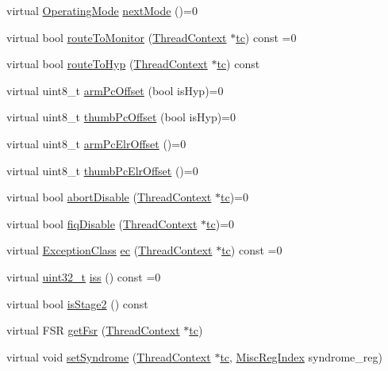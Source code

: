 \begin{DoxyCompactItemize}
\item 
virtual \hyperlink{namespaceArmISA_ae306b3353ed3d62bb2e6de130b3c9eaa}{OperatingMode} \hyperlink{classArmISA_1_1ArmFault_a245c0940c93d0130b3efaf4e1d8ad542}{nextMode} ()=0
\item 
virtual bool \hyperlink{classArmISA_1_1ArmFault_af62e0649938431df8cfab96f0e3fb0a1}{routeToMonitor} (\hyperlink{classThreadContext}{ThreadContext} $\ast$\hyperlink{namespaceArmISA_a5aff829af55e65b802d83dfcef4e9dd0}{tc}) const =0
\item 
virtual bool \hyperlink{classArmISA_1_1ArmFault_a6fa7b734487c2a8da04a28ace414a355}{routeToHyp} (\hyperlink{classThreadContext}{ThreadContext} $\ast$\hyperlink{namespaceArmISA_a5aff829af55e65b802d83dfcef4e9dd0}{tc}) const 
\item 
virtual uint8\_\-t \hyperlink{classArmISA_1_1ArmFault_a62f88e7446d881692b70a4c53a66709e}{armPcOffset} (bool isHyp)=0
\item 
virtual uint8\_\-t \hyperlink{classArmISA_1_1ArmFault_a5622623cc4ac5dfcc5b2c78c41997ce4}{thumbPcOffset} (bool isHyp)=0
\item 
virtual uint8\_\-t \hyperlink{classArmISA_1_1ArmFault_ac6225f20625dd9cd1d2ff5a5813ccb56}{armPcElrOffset} ()=0
\item 
virtual uint8\_\-t \hyperlink{classArmISA_1_1ArmFault_a846a83fa30036c124fe623647dd70c5d}{thumbPcElrOffset} ()=0
\item 
virtual bool \hyperlink{classArmISA_1_1ArmFault_a159a2321e7b2cdb89571d6bb04064c4a}{abortDisable} (\hyperlink{classThreadContext}{ThreadContext} $\ast$\hyperlink{namespaceArmISA_a5aff829af55e65b802d83dfcef4e9dd0}{tc})=0
\item 
virtual bool \hyperlink{classArmISA_1_1ArmFault_a90898a2c4e92e85e6cdecddc2d82a621}{fiqDisable} (\hyperlink{classThreadContext}{ThreadContext} $\ast$\hyperlink{namespaceArmISA_a5aff829af55e65b802d83dfcef4e9dd0}{tc})=0
\item 
virtual \hyperlink{namespaceArmISA_a04034d12009cf36227f4d2abff3331a2}{ExceptionClass} \hyperlink{classArmISA_1_1ArmFault_ab1ac230a4768ca0e080718a7382ecc18}{ec} (\hyperlink{classThreadContext}{ThreadContext} $\ast$\hyperlink{namespaceArmISA_a5aff829af55e65b802d83dfcef4e9dd0}{tc}) const =0
\item 
virtual \hyperlink{Type_8hh_a435d1572bf3f880d55459d9805097f62}{uint32\_\-t} \hyperlink{classArmISA_1_1ArmFault_a12a2298da9af24c62275dac1cf76a888}{iss} () const =0
\item 
virtual bool \hyperlink{classArmISA_1_1ArmFault_a61bc59380024a05bdcbb39fb27e0293d}{isStage2} () const 
\item 
virtual FSR \hyperlink{classArmISA_1_1ArmFault_a48f7b7354d7dcf9850a65f9f433c4871}{getFsr} (\hyperlink{classThreadContext}{ThreadContext} $\ast$\hyperlink{namespaceArmISA_a5aff829af55e65b802d83dfcef4e9dd0}{tc})
\item 
virtual void \hyperlink{classArmISA_1_1ArmFault_a618b248f8f365d00661d7663152848d6}{setSyndrome} (\hyperlink{classThreadContext}{ThreadContext} $\ast$\hyperlink{namespaceArmISA_a5aff829af55e65b802d83dfcef4e9dd0}{tc}, \hyperlink{namespaceArmISA_a1e522017e015d4c7efd6b2360143aa67}{MiscRegIndex} syndrome\_\-reg)
\end{DoxyCompactItemize}
